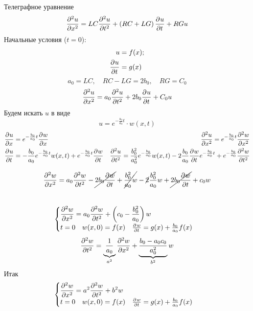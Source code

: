 \begin{example}{Телеграфное уравнение}
\[
	\frac{\partial^{2}u}{\partial x^{2}} = LC \frac{\partial^{2}u}{\partial t^{2}} + \left(RC + LG \right) \frac{\partial^{}u}{\partial t^{}} + RGu
\]
Начальные условия ($t = 0$): 
\begin{align*}
	u &= f(x);\\
	\frac{\partial^{}u}{\partial t^{}} &= g(x)
\end{align*}
\[
		a_0 = LC, \quad RC - LG = 2 b_0, \quad RG = C_0
\]
\[
	\frac{\partial^{2}u}{\partial x^{2}} = a_0 \frac{\partial^{2}u}{\partial t^{2}} + 2 b_0 \frac{\partial^{}u}{\partial t^{}} + C_0 u
\]
Будем искать $u$ в виде 
\[
	u = e^{- \frac{b_0}{a_0}t} \cdot w(x, t)
\]
\begin{align*}
	&\frac{\partial^{}u}{\partial x^{}} = e^{- \frac{b_0}{a_0}t} \frac{\partial^{}w}{\partial x^{}} &\frac{\partial^{2}u}{\partial x^{2}} = e^{- \frac{b_0}{a_0}t} \frac{\partial^{2}w}{\partial x^{2}}\\
	&\frac{\partial^{}u}{\partial t^{}} = - \frac{b_0}{a_0} e^{- \frac{b_0}{a_0} t} w(x,t) + e^{- \frac{b_0}{a_0}t} \frac{\partial^{}w}{\partial t^{}}
	&\frac{\partial^{2}u}{\partial t^{2}} = \frac{b_0^2}{a_0^2} e^{-\frac{b_0}{a_0}} w(x, t) - 2 \frac{b_0}{a_0} \frac{\partial^{}w}{\partial t^{}} e^{- \frac{b_0}{a_0}t} + e^{- \frac{b_0}{a_0}} \frac{\partial^{2}w}{\partial t^{2}}
\end{align*}

\[
	\frac{\partial^{2}w}{\partial x^{2}} = a_0 \frac{\partial^{2}w}{\partial t^{2}} - \cancel{2 b_0 \frac{\partial^{}w}{\partial t^{}}} + \cancel{\frac{b_0^2}{a_0} w} - \cancel{2} \frac{b_0^2}{a_0} w + \cancel{2 b_0 \frac{\partial^{}w}{\partial t^{}}} + c_0 w
\]\\
\[
	\begin{cases}
		\displaystyle\frac{\partial^{2}w}{\partial x^{2}} = a_0 \frac{\partial^{2}w}{\partial t^{2}} + \left(c_0 - \frac{b_0^2}{a_0} \right) w\\
		t = 0 \quad w(x, 0) = f(x) \quad \frac{\partial^{}w}{\partial t^{}} = g(x) + \frac{b_0}{a_0} f(x)
	\end{cases}
\]
\[	
	\frac{\partial^{2}w}{\partial t^{2}} = \underbrace{\frac{1}{a_0}}_{a^2} \frac{\partial^{2}w}{\partial x^{2}} + \underbrace{\frac{b_0 - a_0 c_0}{a_0^2}}_{b^2} w
\]
Итак
\[
	\begin{cases}
		\displaystyle\frac{\partial^{2}w}{\partial x^{2}} = a^2 \frac{\partial^{2}w}{\partial t^{2}} +b^2 w\\
		t = 0 \quad w(x, 0) = f(x) \quad \frac{\partial^{}w}{\partial t^{}} = g(x) + \frac{b_0}{a_0} f(x)
	\end{cases}
\]\\


\end{example}
